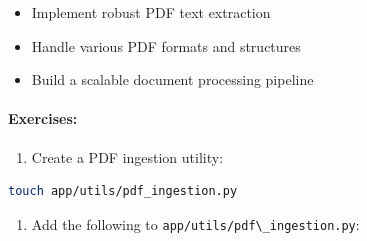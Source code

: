 \documentclass[
  screen,review,acmlarge]{acmart}
\newcommand{\passthrough}[1]{#1}
\providecommand{\tightlist}{%
  \setlength{\itemsep}{0pt}\setlength{\parskip}{0pt}}
\begin{document}
\begin{itemize}
\tightlist
\item
  Implement robust PDF text extraction
\item
  Handle various PDF formats and structures
\item
  Build a scalable document processing pipeline
\end{itemize}

\paragraph{Exercises:}\label{exercises-1}

\begin{enumerate}
\def\labelenumi{\arabic{enumi}.}
\tightlist
\item
  Create a PDF ingestion utility:
\end{enumerate}

\begin{lstlisting}[language=bash]
touch app/utils/pdf_ingestion.py
\end{lstlisting}

\begin{enumerate}
\def\labelenumi{\arabic{enumi}.}
\setcounter{enumi}{1}
\tightlist
\item
  Add the following to \passthrough{\lstinline!app/utils/pdf\_ingestion.py!}:
\end{enumerate}
\end{document}
